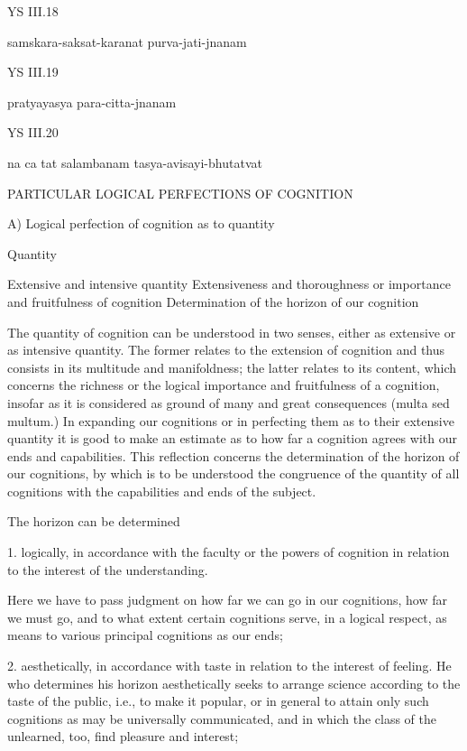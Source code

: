 YS III.18

    samskara-saksat-karanat purva-jati-jnanam

YS III.19

    pratyayasya para-citta-jnanam

YS III.20

    na ca tat salambanam tasya-avisayi-bhutatvat

    PARTICULAR LOGICAL PERFECTIONS OF COGNITION

    A) Logical perfection of cognition as to quantity

    Quantity

        Extensive and intensive quantity
        Extensiveness and thoroughness
        or importance and fruitfulness of cognition
        Determination of the horizon of our cognition

    The quantity of cognition can be understood in two senses,
    either as extensive or as intensive quantity.
    The former relates to the extension of cognition and
    thus consists in its multitude and manifoldness;
    the latter relates to its content, which concerns the richness
    or the logical importance and fruitfulness of a cognition,
    insofar as it is considered as ground of many and great consequences (multa sed multum.)
    In expanding our cognitions or in perfecting them as to their extensive quantity
    it is good to make an estimate as to how far a cognition agrees with our ends and capabilities.
    This reflection concerns the determination of the horizon of our cognitions,
    by which is to be understood the congruence of the quantity of all cognitions
    with the capabilities and ends of the subject.

    The horizon can be determined

    1. logically, in accordance with the faculty or the powers of cognition
    in relation to the interest of the understanding.

    Here we have to pass judgment on how far we can go in our cognitions,
    how far we must go, and to what extent certain cognitions serve,
    in a logical respect, as means to various principal cognitions as our ends;

    2. aesthetically, in accordance with taste in relation to the interest of feeling.
    He who determines his horizon aesthetically seeks to arrange science according
    to the taste of the public, i.e., to make it popular, or in general to attain only
    such cognitions as may be universally communicated, and in which the class
    of the unlearned, too, find pleasure and interest;

